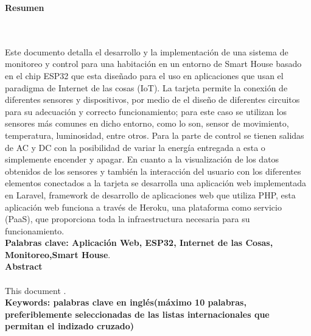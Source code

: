 \newpage
\textbf{\LARGE Resumen}
\\\\
Este documento detalla el desarrollo y la implementación de una sistema de monitoreo y control para una habitación en un entorno de Smart House basado en el chip ESP32 que esta diseñado para el uso en aplicaciones que usan el paradigma de Internet de las cosas (IoT). La tarjeta permite la conexión de diferentes sensores y dispositivos, por medio de el diseño de diferentes circuitos para su adecuación y correcto funcionamiento; para este caso se utilizan los sensores más comunes en dicho entorno, como lo son, sensor de movimiento, temperatura, luminosidad, entre otros. Para la parte de control se tienen salidas de AC y DC con la posibilidad de variar la energía entregada a esta o simplemente encender y apagar. En cuanto a la visualización de los datos obtenidos de los sensores y también la interacción del usuario con los diferentes elementos conectados a la tarjeta se desarrolla una aplicación web implementada en Laravel, framework de desarrollo de aplicaciones web que utiliza PHP, esta aplicación web funciona a través de Heroku, una plataforma como servicio (PaaS), que proporciona toda la infraestructura necesaria para su funcionamiento.\\
\textbf{\small Palabras clave: Aplicación Web, ESP32, Internet de las Cosas, Monitoreo,Smart House}.\\[2.0cm]
\textbf{\LARGE Abstract}\\\\
This document .\\[2.0cm]
\textbf{\small Keywords: palabras clave en ingl\'{e}s(m\'{a}ximo 10 palabras, preferiblemente seleccionadas de las listas internacionales que permitan el indizado cruzado)}\\